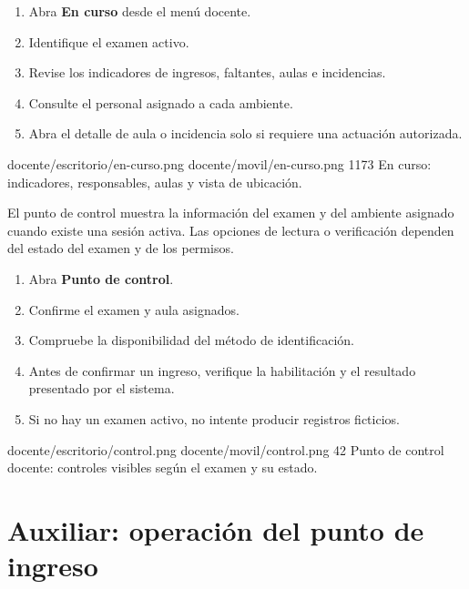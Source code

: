 \documentclass[11pt,a4paper]{article}
\begin{document}
\pasos
\begin{enumerate}
\item Abra \textbf{En curso} desde el menú docente.
\item Identifique el examen activo.
\item Revise los indicadores de ingresos, faltantes,
aulas e incidencias.
\item Consulte el personal asignado a cada ambiente.
\item Abra el detalle de aula o incidencia solo
si requiere una actuación autorizada.
\end{enumerate}


\Pantallas
{docente/escritorio/en-curso.png}
{docente/movil/en-curso.png}
{1173}
{En curso: indicadores, responsables,
aulas y vista de ubicación.}



El punto de control muestra la información del examen
y del ambiente asignado cuando existe una sesión activa.
Las opciones de lectura o verificación dependen del estado
del examen y de los permisos.

\pasos
\begin{enumerate}
\item Abra \textbf{Punto de control}.
\item Confirme el examen y aula asignados.
\item Compruebe la disponibilidad del método de identificación.
\item Antes de confirmar un ingreso, verifique la habilitación
y el resultado presentado por el sistema.
\item Si no hay un examen activo,
no intente producir registros ficticios.
\end{enumerate}


\Pantallas
{docente/escritorio/control.png}
{docente/movil/control.png}
{42}
{Punto de control docente: controles visibles
según el examen y su estado.}

\section{Auxiliar: operación del punto de ingreso}
\end{document}
